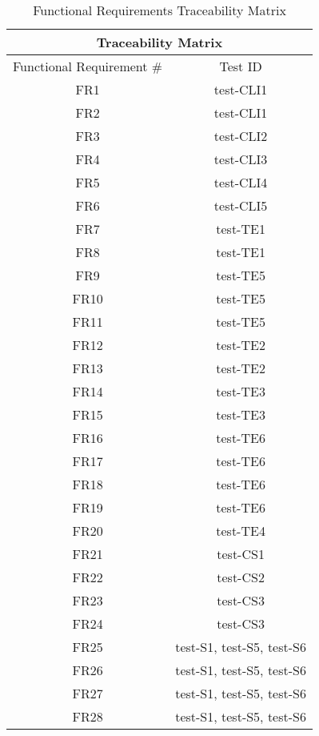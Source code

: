 \documentclass[12pt, titlepage]{article}
\begin{document}
\begin{table}[H]
    \centering
\begin{tabular}{|c|c|}
\hline
\multicolumn{2}{|c|}{Traceability Matrix} \\ \hline
Functional Requirement \# & Test ID \\ \hline
FR1 & test-CLI1 \\ \hline
FR2 & test-CLI1 \\ \hline
FR3 & test-CLI2 \\ \hline
FR4 & test-CLI3 \\ \hline
FR5 & test-CLI4 \\ \hline
FR6 & test-CLI5 \\ \hline
FR7 & test-TE1 \\ \hline
FR8 & test-TE1 \\ \hline
FR9 & test-TE5 \\ \hline
FR10 & test-TE5 \\ \hline
FR11 & test-TE5 \\ \hline
FR12 & test-TE2 \\ \hline
FR13 & test-TE2 \\ \hline
FR14 & test-TE3 \\ \hline
FR15 & test-TE3 \\ \hline
FR16 & test-TE6 \\ \hline
FR17 & test-TE6 \\ \hline
FR18 & test-TE6 \\ \hline
FR19 & test-TE6 \\ \hline
FR20 & test-TE4 \\ \hline
FR21 & test-CS1 \\ \hline
FR22 & test-CS2 \\ \hline
FR23 & test-CS3 \\ \hline
FR24 & test-CS3 \\ \hline
FR25 & test-S1, test-S5, test-S6 \\ \hline
FR26 & test-S1, test-S5, test-S6 \\ \hline
FR27 & test-S1, test-S5, test-S6 \\ \hline
FR28 & test-S1, test-S5, test-S6 \\ \hline
\end{tabular}
    \caption{Functional Requirements Traceability Matrix}
    \label{tab:frtrace}
\end{table}
\end{document}
